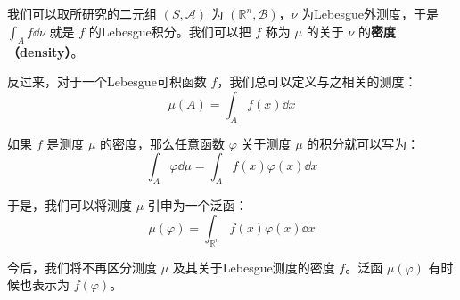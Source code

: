 我们可以取所研究的二元组 $(S, \mathcal{A})$ 为 $(\mathbb{R}^n, \mathcal{B})$，$\nu$ 为Lebesgue外测度，于是 $\int_A f \dd \nu$ 就是 $f$ 的Lebesgue积分。我们可以把 $f$ 称为 $\mu$ 的关于 $\nu$ 的\textbf{密度（density）}。

反过来，对于一个Lebesgue可积函数 $f$，我们总可以定义与之相关的测度：
\begin{equation}
\mu(A) = \int_A f(x) \dd x
\end{equation}

如果 $f$ 是测度 $\mu$ 的密度，那么任意函数 $\varphi$ 关于测度 $\mu$ 的积分就可以写为：
\begin{equation}
\int_A \varphi \dd \mu = \int_A f(x)\varphi(x) \dd x
\end{equation}

于是，我们可以将测度 $\mu$ 引申为一个泛函：
\begin{equation}
\mu(\varphi) = \int_{\mathbb{R}^n} f(x)\varphi(x) \dd x
\end{equation}

今后，我们将不再区分测度 $\mu$ 及其关于Lebesgue测度的密度 $f$。泛函 $\mu(\varphi)$ 有时候也表示为 $f(\varphi)$。












